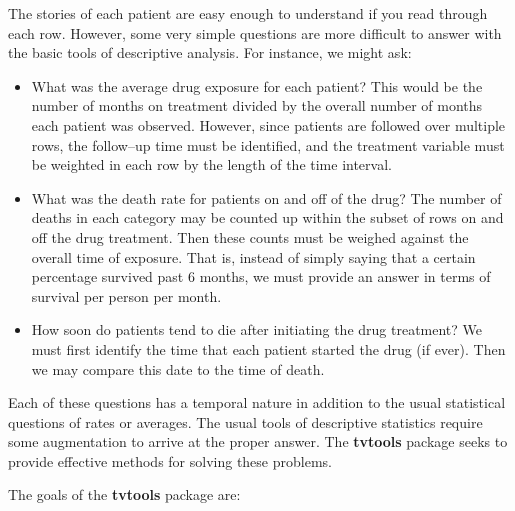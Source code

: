 \documentclass{article}
\begin{document}
\noindent The stories of each patient are easy enough to understand if you read through each row.  However, some very simple questions are more difficult to answer with the basic tools of descriptive analysis.  For instance, we might ask:

\begin{itemize}
\item What was the average drug exposure for each patient?  This would be the number of months on treatment divided by the overall number of months each patient was observed.  However, since patients are followed over multiple rows, the follow--up time must be identified, and the treatment variable must be weighted in each row by the length of the time interval.

\item What was the death rate for patients on and off of the drug?  The number of deaths in each category may be counted up within the subset of rows on and off the drug treatment.  Then these counts must be weighed against the overall time of exposure.  That is, instead of simply saying that a certain percentage survived past 6 months, we must provide an answer in terms of survival per person per month.

\item How soon do patients tend to die after initiating the drug treatment?  We must first identify the time that each patient started the drug (if ever).  Then we may compare this date to the time of death. 
\end{itemize}

\noindent Each of these questions has a temporal nature in addition to the usual statistical questions of rates or averages.  The usual tools of descriptive statistics require some augmentation to arrive at the proper answer.  The \textbf{tvtools} package seeks to provide effective methods for solving these problems.

\noindent The goals of the \textbf{tvtools} package are:
\end{document}
